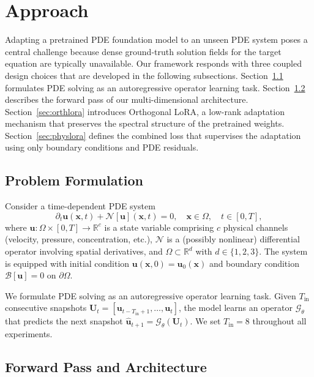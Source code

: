 \documentclass{article}
\begin{document}
\section{Approach}
\label{sec:method}

Adapting a pretrained PDE foundation model to an unseen PDE system poses a central challenge because dense ground-truth solution fields for the target equation are typically unavailable. Our framework responds with three coupled design choices that are developed in the following subsections. Section~\ref{sec:formulation} formulates PDE solving as an autoregressive operator learning task. Section~\ref{sec:architecture} describes the forward pass of our multi-dimensional architecture. Section~\ref{sec:orthlora} introduces Orthogonal LoRA, a low-rank adaptation mechanism that preserves the spectral structure of the pretrained weights. Section~\ref{sec:physlora} defines the combined loss that supervises the adaptation using only boundary conditions and PDE residuals.

\subsection{Problem Formulation}
\label{sec:formulation}

Consider a time-dependent PDE system
\begin{equation}
\partial_t \mathbf{u}(\mathbf{x}, t) + \mathcal{N}[\mathbf{u}](\mathbf{x}, t) = 0, \quad \mathbf{x} \in \Omega, \quad t \in [0, T],
\end{equation}
where $\mathbf{u}\!: \Omega \times [0,T] \to \mathbb{R}^c$ is a state variable comprising $c$ physical channels (velocity, pressure, concentration, etc.), $\mathcal{N}$ is a (possibly nonlinear) differential operator involving spatial derivatives, and $\Omega \subset \mathbb{R}^d$ with $d \in \{1,2,3\}$. The system is equipped with initial condition $\mathbf{u}(\mathbf{x}, 0) = \mathbf{u}_0(\mathbf{x})$ and boundary condition $\mathcal{B}[\mathbf{u}] = 0$ on $\partial\Omega$.

We formulate PDE solving as an autoregressive operator learning task. Given $T_{\mathrm{in}}$ consecutive snapshots $\mathbf{U}_t = [\mathbf{u}_{t-T_{\mathrm{in}}+1}, \ldots, \mathbf{u}_t]$, the model learns an operator $\mathcal{G}_\theta$ that predicts the next snapshot $\hat{\mathbf{u}}_{t+1} = \mathcal{G}_\theta(\mathbf{U}_t)$. We set $T_{\mathrm{in}}=8$ throughout all experiments.

\subsection{Forward Pass and Architecture}
\label{sec:architecture}
\end{document}
